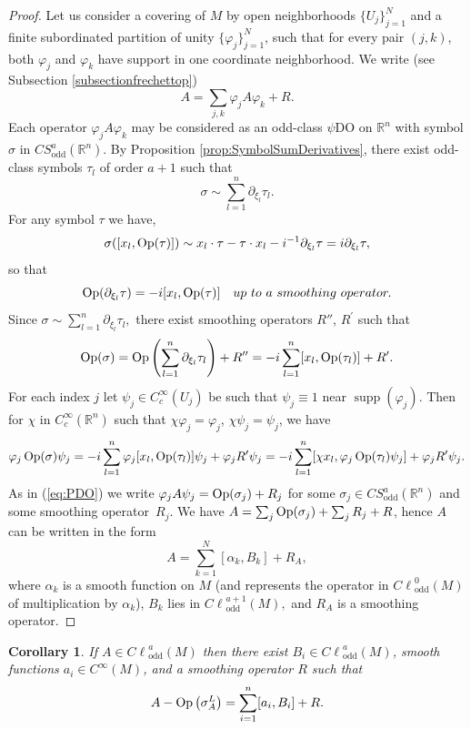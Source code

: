 \documentclass[11pt]{article}
\newtheorem{corollary}{Corollary}
\DeclareMathOperator{\odd}{odd} \DeclareMathOperator{\supp}{supp}
\def \Cl {{C\ell}}
\begin{document}
\begin{proof}
Let us consider a covering of $M$ by open neighborhoods $\{U_j\}_{j=1}^N$ and a f\/inite subordinated partition of unity $\{\varphi_j\}_{j=1}^N$, such that for every pair $(j,k)$, both $\varphi_j$ and $\varphi_k$ have support in one coordinate neighborhood. We write (see Subsection \ref{subsectionfrechettop})
\[
A=\sum_{j,k}\varphi_jA\varphi_k+R.
\]
Each operator $\varphi_jA\varphi_k$ may be considered as an odd-class $\psi$DO on $\mathbb{R}^n$ with symbol $\sigma$ in $CS^a_{\odd}(\mathbb{R}^n).\!$ By Proposition \ref{prop:SymbolSumDerivatives}, there exist odd-class symbols $\tau_l$ of order $a+1$ such that
\[
\sigma\sim\sum\limits_{l=1}^n\partial_{\xi_l}\tau_l.
\]
For any symbol $\tau$ we have,
\[
\sigma([x_l,\operatorname{Op}(\tau)])\sim x_l\cdot \tau-\tau\cdot x_l-i^{-1}\partial_{\xi_l}\tau =i\partial_{\xi_l}\tau,
\]
so that
\[
\Op(\partial_{\xi_l}\tau)=-i[x_l,\Op(\tau)] \quad {\rm up\ to\ a\ smoothing\ operator.}
\]
Since $\sigma\sim\sum\limits_{l=1}^n\partial_{\xi_l}\tau_l,$ there exist smoothing operators $R''$, $R^\prime$ such that
\[
\operatorname{Op}(\sigma)=\operatorname{Op}\left(\sum\limits_{l=1}^n\partial_{\xi_l}\tau_l\right)+R''=-i\sum\limits_{l=1}^n [x_l,\operatorname{Op}(\tau_l)]+R^\prime.
\]
For each index $j$ let $\psi_j\in C_c^\infty(U_j)$ be such that $\psi_j\equiv1$ near $\supp(\varphi_j)$. Then for $\chi$ in $C_c^\infty(\mathbb{R}^n)$ such that $\chi\varphi_j=\varphi_j$, $\chi\psi_j=\psi_j$, we have
\begin{gather*}
\varphi_j\operatorname{Op}(\sigma)\psi_j
 =-i\sum\limits_{l=1}^n\varphi_j[x_l,\operatorname{Op}(\tau_l)]\psi_j+\varphi_jR^\prime\psi_j
 =-i\sum\limits_{l=1}^n [\chi x_l,\varphi_j\operatorname{Op}(\tau_l)\psi_j]+\varphi_jR^\prime\psi_j.
\end{gather*}
As in (\ref{eq:PDO}) we write $\varphi_j A \psi_j= \operatorname{Op}(\sigma_{j}) +R_{j}$ for some $\sigma_j\in CS^{a}_{\odd}(\mathbb{R}^n)$ and some smoothing ope\-ra\-tor~$R_{j}$. We have $A= \sum _{j}\operatorname{Op}(\sigma_{j})+\sum _{j}R_{j}+R$, hence $A$ can be written in the form
\[
A=\sum\limits_{k=1}^{N}[\alpha_k,B_k]+R_A,
\]
where $\alpha_k$ is a smooth function on $M$ (and represents the operator in $\Cl^{0}_{\odd}(M)$ of multiplication by $\alpha_k$), $B_k$ lies in $\Cl^{a+1}_{\odd}(M),$ and $R_A$ is a smoothing operator.
\end{proof}

\begin{corollary}\label{corol2}
If $A\in \Cl^{a}_{\odd}(M)$ then there exist $B_i\in \Cl^{a}_{\odd}(M)$, smooth functions $a_i\in C^\infty(M)$, and a smoothing operator $R$ such that
\[
A-\operatorname{Op}\big(\sigma_A^L\big)=\sum_{i=1}^n[a_i,B_i]+R.
\]
\end{corollary}
\end{document}
